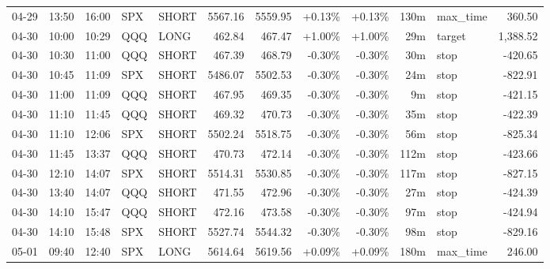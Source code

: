 \documentclass[11pt,a4paper,twoside]{article}
\begin{document}
\begin{center}
\begin{longtable}{>{\color{txtmain}}l l l l l r r r r r >{\color{txtmain}}l r}
04-29 & 13:50 & 16:00 & SPX & SHORT & 5567.16 & 5559.95 & \textcolor{wingreen}{+0.13\%} & \textcolor{wingreen}{+0.13\%} & 130m & max\_time & \textcolor{wingreen}{360.50} \\
04-30 & 10:00 & 10:29 & QQQ & LONG & 462.84 & 467.47 & \textcolor{wingreen}{+1.00\%} & \textcolor{wingreen}{+1.00\%} & 29m & target & \textcolor{wingreen}{1,388.52} \\
04-30 & 10:30 & 11:00 & QQQ & SHORT & 467.39 & 468.79 & \textcolor{lossred}{-0.30\%} & \textcolor{lossred}{-0.30\%} & 30m & stop & \textcolor{lossred}{-420.65} \\
04-30 & 10:45 & 11:09 & SPX & SHORT & 5486.07 & 5502.53 & \textcolor{lossred}{-0.30\%} & \textcolor{lossred}{-0.30\%} & 24m & stop & \textcolor{lossred}{-822.91} \\
04-30 & 11:00 & 11:09 & QQQ & SHORT & 467.95 & 469.35 & \textcolor{lossred}{-0.30\%} & \textcolor{lossred}{-0.30\%} & 9m & stop & \textcolor{lossred}{-421.15} \\
04-30 & 11:10 & 11:45 & QQQ & SHORT & 469.32 & 470.73 & \textcolor{lossred}{-0.30\%} & \textcolor{lossred}{-0.30\%} & 35m & stop & \textcolor{lossred}{-422.39} \\
04-30 & 11:10 & 12:06 & SPX & SHORT & 5502.24 & 5518.75 & \textcolor{lossred}{-0.30\%} & \textcolor{lossred}{-0.30\%} & 56m & stop & \textcolor{lossred}{-825.34} \\
04-30 & 11:45 & 13:37 & QQQ & SHORT & 470.73 & 472.14 & \textcolor{lossred}{-0.30\%} & \textcolor{lossred}{-0.30\%} & 112m & stop & \textcolor{lossred}{-423.66} \\
04-30 & 12:10 & 14:07 & SPX & SHORT & 5514.31 & 5530.85 & \textcolor{lossred}{-0.30\%} & \textcolor{lossred}{-0.30\%} & 117m & stop & \textcolor{lossred}{-827.15} \\
04-30 & 13:40 & 14:07 & QQQ & SHORT & 471.55 & 472.96 & \textcolor{lossred}{-0.30\%} & \textcolor{lossred}{-0.30\%} & 27m & stop & \textcolor{lossred}{-424.39} \\
04-30 & 14:10 & 15:47 & QQQ & SHORT & 472.16 & 473.58 & \textcolor{lossred}{-0.30\%} & \textcolor{lossred}{-0.30\%} & 97m & stop & \textcolor{lossred}{-424.94} \\
04-30 & 14:10 & 15:48 & SPX & SHORT & 5527.74 & 5544.32 & \textcolor{lossred}{-0.30\%} & \textcolor{lossred}{-0.30\%} & 98m & stop & \textcolor{lossred}{-829.16} \\
05-01 & 09:40 & 12:40 & SPX & LONG & 5614.64 & 5619.56 & \textcolor{wingreen}{+0.09\%} & \textcolor{wingreen}{+0.09\%} & 180m & max\_time & \textcolor{wingreen}{246.00} \\

\end{longtable}
\end{center}
\end{document}
